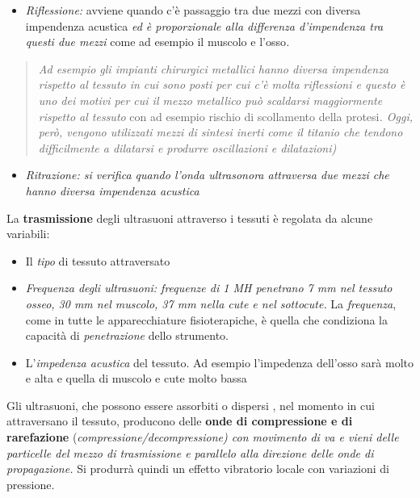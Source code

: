 \documentclass[]{article}
\begin{document}
\begin{itemize}
\item
  \emph{\emph{Riflessione:}} avviene quando c'è passaggio tra due mezzi
  con diversa impendenza acustica \emph{ed è proporzionale alla
  differenza d'impendenza tra questi due mezzi} come ad esempio il
  muscolo e l'osso\emph{.}
\end{itemize}

\begin{quote}
\emph{Ad esempio gli impianti chirurgici metallici hanno diversa
impendenza rispetto al tessuto in cui sono posti per cui c'è molta
riflessioni e questo è uno dei motivi per cui il mezzo metallico può
scaldarsi maggiormente rispetto al tessuto} con ad esempio rischio di
scollamento della protesi\emph{. Oggi, però, vengono utilizzati mezzi di
sintesi inerti come il titanio che tendono difficilmente a dilatarsi e
produrre oscillazioni e dilatazioni) }
\end{quote}

\begin{itemize}
\item
  \emph{Ritrazione: si verifica quando l'onda ultrasonora attraversa due
  mezzi che hanno diversa impendenza acustica}
\end{itemize}

La \textbf{trasmissione} degli ultrasuoni attraverso i tessuti è
regolata da alcune variabili:

\begin{itemize}
\item
  Il \emph{tipo} di tessuto attraversato
\item
  \emph{\emph{Frequenza degli ultrasuoni: frequenze di 1 MH penetrano 7
  mm nel tessuto osseo, 30 mm nel muscolo, 37 mm nella cute e nel
  sottocute.}} La \emph{frequenza}, come in tutte le apparecchiature
  fisioterapiche, è quella che condiziona la capacità di
  \emph{penetrazione} dello strumento.
\item
  L'\emph{impedenza acustica} del tessuto. Ad esempio l'impedenza
  dell'osso sarà molto e alta e quella di muscolo e cute molto bassa
\end{itemize}

Gli ultrasuoni, che possono essere assorbiti o dispersi , nel momento in
cui attraversano il tessuto, producono delle \textbf{onde di
compressione e di rarefazione} (\emph{compressione/decompressione) con
movimento di va e vieni delle particelle del mezzo di trasmissione e
parallelo alla direzione delle onde di propagazione.} Si produrrà quindi
un effetto vibratorio locale con variazioni di pressione.
\end{document}
